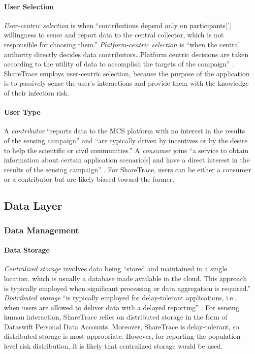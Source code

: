 \paragraph{User Selection}

\emph{User-centric selection} is when ``contributions depend only on participants['] willingness to sense and report data to the central collector, which is not responsible for choosing them.'' \emph{Platform-centric selection} is ``when the central authority directly decides data contributors{\ldots}Platform centric decisions are taken according to the utility of data to accomplish the targets of the campaign'' \cite{Capponi2019}. ShareTrace employs user-centric selection, because the purpose of the application is to passively sense the user's interactions and provide them with the knowledge of their infection risk.

\paragraph{User Type}

A \emph{contributor} ``reports data to the MCS platform with no interest in the results of the sensing campaign'' and ``are typically driven by incentives or by the desire to help the scientific or civil communities.'' A \emph{consumer} joins ``a service to obtain information about certain application scenario[s] and have a direct interest in the results of the sensing campaign'' \cite{Capponi2019}. For ShareTrace, users can be either a consumer or a contributor but are likely biased toward the former.

\subsection{Data Layer}

\subsubsection{Data Management}

\paragraph{Data Storage}

\emph{Centralized storage} involves data being ``stored and maintained in a single location, which is usually a database made available in the cloud. This approach is typically employed when significant processing or data aggregation is required.'' \emph{Distributed storage} ``is typically employed for delay-tolerant applications, i.e., when users are allowed to deliver data with a delayed reporting'' \cite{Capponi2019}. For sensing human interaction, ShareTrace relies on distributed storage in the form of Dataswift Personal Data Accounts. Moreover, ShareTrace is delay-tolerant, so distributed storage is most appropriate. However, for reporting the population-level risk distribution, it is likely that centralized storage would be used.

